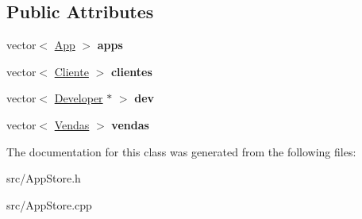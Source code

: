 \subsection*{Public Attributes}
\begin{DoxyCompactItemize}
\item 
\hypertarget{class_app_store_ab618a846f9c32b6897bf3e694af19c43}{vector$<$ \hyperlink{class_app}{App} $>$ {\bfseries apps}}\label{class_app_store_ab618a846f9c32b6897bf3e694af19c43}

\item 
\hypertarget{class_app_store_a6f1aa46e983d0e8fecd103c47c8f7eea}{vector$<$ \hyperlink{class_cliente}{Cliente} $>$ {\bfseries clientes}}\label{class_app_store_a6f1aa46e983d0e8fecd103c47c8f7eea}

\item 
\hypertarget{class_app_store_af62367eceae89987728c11c70318a93a}{vector$<$ \hyperlink{class_developer}{Developer} $\ast$ $>$ {\bfseries dev}}\label{class_app_store_af62367eceae89987728c11c70318a93a}

\item 
\hypertarget{class_app_store_a0b519316efd39486e4577dc95f1dfea3}{vector$<$ \hyperlink{class_vendas}{Vendas} $>$ {\bfseries vendas}}\label{class_app_store_a0b519316efd39486e4577dc95f1dfea3}

\end{DoxyCompactItemize}


The documentation for this class was generated from the following files\+:\begin{DoxyCompactItemize}
\item 
src/App\+Store.\+h\item 
src/App\+Store.\+cpp\end{DoxyCompactItemize}

